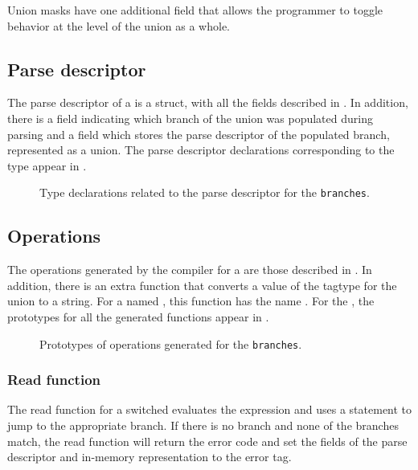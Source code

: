 %
\noindent
Union masks have one additional field  that allows the
programmer to toggle behavior at the level of the union as a whole.

\subsection{Parse descriptor}
\label{sec:unions-parse-descriptors}
The parse descriptor of a \Punion{} is a \C{} struct, with all
the fields described in . In
addition,  there is a  field indicating which branch of the
union was populated during parsing and a  field which stores
the parse descriptor of the populated branch, represented as a \C{}
union.  The parse descriptor declarations corresponding to the
\pads{} type 
appear in .

\begin{figure}
\caption{Type declarations related to the parse descriptor for
  the \Punion{} \texttt{branches}.}
\label{fig:punion-pd}
\end{figure}

\subsection{Operations}
The operations generated by the \pads{} compiler for a \Punion{} are
those described in .  In addition, there
is an extra function that converts a value of the tagtype for the
union to a string.  For a \Punion{} named , this function
has the name .  
For the \Punion{}
, the prototypes for all the generated functions appear in
.
\begin{figure}
\caption{Prototypes of operations generated for
  the \Punion{} \texttt{branches}.}
\label{fig:punion-ops}
\end{figure}



\subsubsection{Read function}
The read function for a switched \Punion{} evaluates the \Pswitch{}
expression and uses a \C{}  statement to jump to the
appropriate branch.  If there is no \Pdefault{} branch and none of the
\Pcase{} branches match,  the read function will return the error code
 and set the  fields of the parse
descriptor and in-memory representation to the error tag. 

